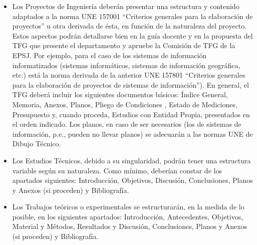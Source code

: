 \begin{itemize}
\item Los Proyectos de Ingeniería deberán presentar una estructura y contenido adaptados
a la norma UNE 157001 “Criterios generales para la elaboración de proyectos” u otra
derivada de ésta, en función de la naturaleza del proyecto.
Estos aspectos podrán detallarse bien en la guía docente y en la propuesta del TFG que
presente el departamento y apruebe la Comisión de TFG de la EPSJ. Por ejemplo, para
el caso de los sistemas de información informatizados (sistemas informáticos, sistemas
de información geográfica, etc.) está la norma derivada de la anterior UNE 157801
“Criterios generales para la elaboración de proyectos de sistemas de información”).
En general, el TFG deberá incluir los siguientes documentos básicos: Índice General,
Memoria, Anexos, Planos, Pliego de Condiciones , Estado de Mediciones, Presupuesto
y, cuando proceda, Estudios con Entidad Propia, presentados en el orden indicado. Los
planos, en caso de ser necesarios (los de sistemas de información, p.e., pueden no
llevar planos) se adecuarán a las normas UNE de Dibujo Técnico.  
\item Los Estudios Técnicos, debido a su singularidad, podrán tener una estructura variable
según su naturaleza. Como mínimo, deberían constar de los apartados siguientes:
Introducción, Objetivos, Discusión, Conclusiones, Planos y Anexos (si proceden) y
Bibliografía.
\item Los Trabajos teóricos o experimentales se estructurarán, en la medida de lo posible,
en los siguientes apartados: Introducción, Antecedentes, Objetivos, Material y
Métodos, Resultados y Discusión, Conclusiones, Planos y Anexos (si proceden) y
Bibliografía.
\end{itemize}

